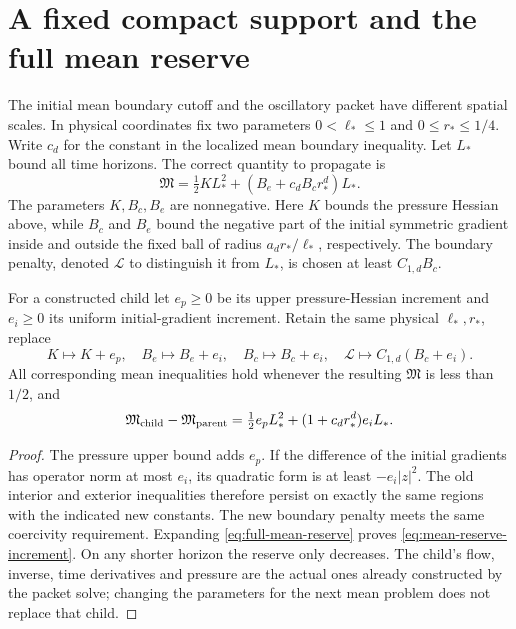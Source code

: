 \section{A fixed compact support and the full mean reserve}
The initial mean boundary cutoff and the oscillatory packet have
different spatial scales. In
physical coordinates fix two parameters $0<\ell_*\leq1$ and
$0\leq r_*\leq1/4$. Write $c_d$ for the constant in the localized mean
boundary inequality. Let $L_*$ bound all time horizons. The correct
quantity to propagate is
\begin{equation}\label{eq:full-mean-reserve}
 \mathfrak M=\tfrac12 K L_*^2+(B_e+c_d B_c r_*^d)L_*.
\end{equation}
The parameters $K,B_c,B_e$ are nonnegative. Here $K$ bounds the pressure
Hessian above, while $B_c$ and $B_e$ bound
the negative part of the initial symmetric gradient inside and outside
the fixed ball of radius $a_d r_*/\ell_*$, respectively. The boundary
penalty, denoted $\mathcal L$ to distinguish it from $L_*$, is chosen
at least $C_{1,d}B_c$.

\begin{lemma}\label{lem:fixed-cutoff}
For a constructed child let $e_p\geq0$ be its upper pressure-Hessian
increment and $e_i\geq0$ its uniform initial-gradient increment. Retain
the same physical $\ell_*,r_*$, replace
\[
 K\mapsto K+e_p,\quad B_e\mapsto B_e+e_i,\quad
 B_c\mapsto B_c+e_i,\quad \mathcal L\mapsto C_{1,d}(B_c+e_i).
\]
All corresponding mean inequalities hold whenever the resulting
$\mathfrak M$ is less than $1/2$, and
\begin{equation}\label{eq:mean-reserve-increment}
 \mathfrak M_{\rm child}-\mathfrak M_{\rm parent}
   =\tfrac12 e_p L_*^2+(1+c_d r_*^d)e_iL_*.
\end{equation}
\end{lemma}
\begin{proof}
The pressure upper bound adds $e_p$. If the difference of the initial
gradients has operator norm at most $e_i$, its quadratic form is at
least $-e_i|z|^2$. The old interior and exterior inequalities therefore
persist on exactly the same regions with the indicated new constants.
The new boundary penalty meets the same coercivity requirement.
Expanding \eqref{eq:full-mean-reserve} proves
\eqref{eq:mean-reserve-increment}. On any shorter horizon the reserve
only decreases. The child's flow, inverse, time derivatives and pressure
are the actual ones already constructed by the packet solve; changing
the parameters for the next mean problem does not replace that child.
\end{proof}

